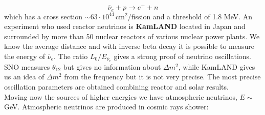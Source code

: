 \documentclass[10.75pt,a4paper,openright,bottom=2cm]{article}
\begin{document}
\[
\overline{\nu}_e+p\to e^++n
\]
which has a cross section $\sim63\cdot10^{44}$\,cm$^2$/fission and a threshold of 1.8 MeV. An experiment who used reactor neutrinos is \textbf{KamLAND} located in Japan and surrounded by more than 50 nuclear reactors of various nuclear power plants. We know the average distance and with inverse beta decay it is possible to measure the energy of $\overline{\nu}_e$. The ratio $L_0/E_{\overline{\nu}_e}$ gives a strong proof of neutrino oscillations. SNO measures $\theta_{12}$ but gives no information about $\Delta m^2$, while KamLAND gives us an idea of $\Delta m^2$ from the frequency but it is not very precise. The most precise oscillation parameters are obtained combining reactor and solar results.\\
Moving now the sources of higher energies we have atmospheric neutrinos, $E\sim$\,GeV. Atmospheric neutrinos are produced in cosmic rays shower:\\
\begin{minipage}{0.5\textwidth}
\begin{center}
\end{center}
\end{minipage}\hfill
\end{document}
